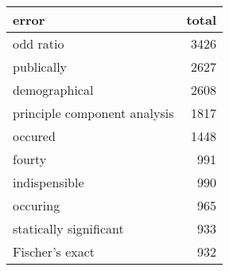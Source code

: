 \begin{table}[ht]
\centering
\begin{tabular}{lr}
 error & total \\ 
  \hline
odd ratio & 3426 \\ 
  publically & 2627 \\ 
  demographical & 2608 \\ 
  principle component analysis & 1817 \\ 
  occured & 1448 \\ 
  fourty & 991 \\ 
  indispensible & 990 \\ 
  occuring & 965 \\ 
  statically significant & 933 \\ 
  Fischer's exact & 932 \\ 
  \end{tabular}
\end{table}
